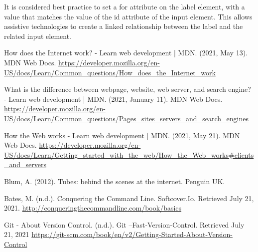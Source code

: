 \documentclass{article}
\begin{document}
    It is considered best practice to set a for attribute on the label element, with a value that matches the value of the id attribute of the input element. This allows assistive technologies to create a linked relationship between the label and the related input element.
    
	\pagebreak
	
	\begin{thebibliography}{9}
		How does the Internet work? - Learn web development | MDN. (2021, May 13). MDN Web Docs.
		\url{https://developer.mozilla.org/en-US/docs/Learn/Common_questions/How_does_the_Internet_work}
		
		What is the difference between webpage, website, web server, and search engine? - Learn web development | MDN. (2021, January 11). MDN Web Docs. \url{https://developer.mozilla.org/en-US/docs/Learn/Common_questions/Pages_sites_servers_and_search_engines}
		
		How the Web works - Learn web development | MDN. (2021, May 21). MDN Web Docs.
		\url{https://developer.mozilla.org/en-US/docs/Learn/Getting_started_with_the_web/How_the_Web_works#clients_and_servers}
		
		Blum, A. (2012). Tubes: behind the scenes at the internet. Penguin UK.
		
		Bates, M. (n.d.). Conquering the Command Line. Softcover.Io. Retrieved July 21, 2021.
		\url{http://conqueringthecommandline.com/book/basics}
		
		Git - About Version Control. (n.d.). Git --Fast-Version-Control. Retrieved July 21, 2021
		\url{https://git-scm.com/book/en/v2/Getting-Started-About-Version-Control}
		\end{thebibliography}
		
	
\end{document}
